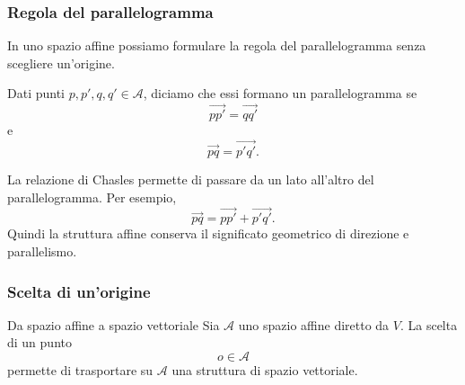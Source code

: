 \documentclass[a4paper]{article}
\begin{document}
\subsubsection{Regola del parallelogramma}

In uno spazio affine possiamo formulare la regola del parallelogramma senza scegliere un'origine.

Dati punti \(p,p',q,q'\in\mathcal{A}\), diciamo che essi formano un parallelogramma se
\[
    \overrightarrow{pp'}=\overrightarrow{qq'}
\]
e
\[
    \overrightarrow{pq}=\overrightarrow{p'q'}.
\]

\begin{center}
\end{center}

La relazione di Chasles permette di passare da un lato all'altro del parallelogramma. Per esempio,
\[
    \overrightarrow{pq}
    =
    \overrightarrow{pp'}
    +
    \overrightarrow{p'q'}.
\]
Quindi la struttura affine conserva il significato geometrico di direzione e parallelismo.

\subsubsection{Scelta di un'origine}

\begin{snippetproposition}{Da spazio affine a spazio vettoriale}
    Sia \(\mathcal{A}\) uno spazio affine diretto da \(V\). La scelta di un punto
    \[
        o\in\mathcal{A}
    \]
    permette di trasportare su \(\mathcal{A}\) una struttura di spazio vettoriale.
\end{snippetproposition}
\end{document}
